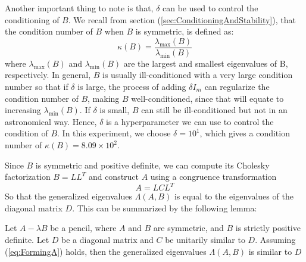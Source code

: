 Another important thing to note is that, $\delta$ can be used to control the conditioning of $B$. We recall from section (\ref{sec:ConditioningAndStability}), that the condition number of $B$ when $B$ is symmetric, is defined as:
\begin{equation}
	\kappa(B) = \frac{\lambda_{\max}(B)}{\lambda_{\min}(B)}
\end{equation}
where $\lambda_{\max}(B)$ and $\lambda_{\min}(B)$ are the largest and smallest eigenvalues of B, respectively.
In general, $B$ is usually ill-conditioned with a very large condition number so that if $\delta$ is large, the process of adding $\delta I_m$ can regularize the condition number of $B$, making $B$ well-conditioned, since that will equate to increasing $\lambda_{\min}(B)$. If $\delta$ is small, $B$ can still be ill-conditioned but not in an astronomical way. Hence, $\delta$ is a hyperparameter we can use to control the condition of $B$. In this experiment, we choose $\delta = 10^{1}$, which gives a condition number of $\kappa(B) = 8.09 \times 10^2$.

Since $B$ is symmetric and positive definite, we can compute its Cholesky factorization $B = LL^T$ and construct $A$ using a congruence transformation
\begin{equation}\label{eq:FormingA}
	A = LCL^T
\end{equation}
So that the generalized eigenvalues $\Lambda(A, B)$ is equal to the eigenvalues of the diagonal matrix $D$. This can be summarized by the following lemma:
\begin{lemma}
	Let $A-\lambda B$ be a pencil, where $A$ and $B$ are symmetric, and $B$ is strictly positive definite. Let $D$ be a diagonal matrix and $C$ be unitarily similar to $D$. Assuming (\ref{eq:FormingA}) holds, then the generalized eigenvalues $\Lambda(A, B)$ is similar to $D$
\end{lemma}


